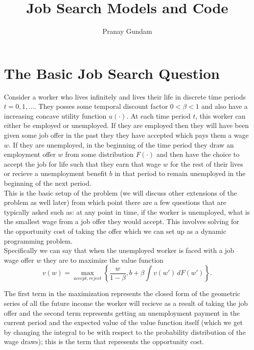 \documentclass[11pt,english]{article}
\title{\textbf{Job Search Models and Code}}
\author{Pranay Gundam}
\begin{document}
\maketitle

\tableofcontents

\section{The Basic Job Search Question}

Consider a worker who lives infinitely and lives their life in discrete time periods $t=0,1,\ldots$. They posses some temporal discount factor $0 < \beta < 1$ and also have a increasing concave utility function $u(\cdot)$. At each time period $t$, this worker can either be employed or unemployed. If they are employed then they will have been given some job offer in the past they they have accepted which pays them a wage $w$. If they are unemployed, in the beginning of the time period they draw an employment offer $w$ from some distribution $F(\cdot)$ and then have the choice to accept the job for life such that they earn that wage $w$ for the rest of their lives or recieve a unemployment benefit $b$ in that period to remain unemployed in the beginning of the next period.\\

\noindent This is the basic setup of the problem (we will discuss other extensions of the problem as well later) from which point there are a few questions that are typically asked such as: at any point in time, if the worker is unemployed, what is the smallest wage from a job offer they would accept. This involves solving for the opportunity cost of taking the offer which we can set up as a dynamic programming problem. \\

\noindent Specifically we can say that when the unemployed worker is faced with a job wage offer $w$ they are to maximize the value function $$v(w) = \max_{accept, reject}\left\{\frac{w}{1-\beta}, b + \beta\int v(w') \,dF(w')\right\}.$$

\noindent The first term in the maximization represents the closed form of the geometric series of all the future income the worker will recieve as a result of taking the job offer and the second term represents getting an unemployment payment in the current period and the expected value of the value function itself (which we get by changing the integral to be with respect to the probability distribution of the wage draws); this is the term that represents the opportunity cost.\\
\end{document}
